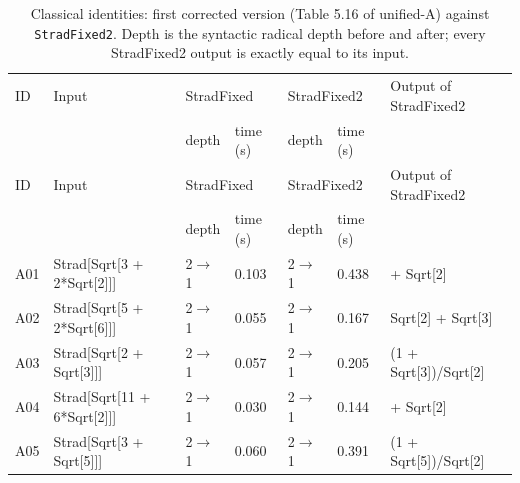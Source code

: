 \begin{longtable}{@{}p{}>{\ttfamily\footnotesize\raggedright\arraybackslash}p{}p{}p{}p{}p{}>{\ttfamily\footnotesize\raggedright\arraybackslash}p{}@{}}
\caption{Classical identities: first corrected version (Table 5.16 of unified-A) against \texttt{StradFixed2}. Depth is the syntactic radical depth before and after; every StradFixed2 output is exactly equal to its input.}\label{tab:cmpA}\\
\toprule ID & Input & \multicolumn{2}{l}{StradFixed} & \multicolumn{2}{l}{StradFixed2} & Output of StradFixed2\\ & & depth & time (s) & depth & time (s) & \\\midrule\endfirsthead
\toprule ID & Input & \multicolumn{2}{l}{StradFixed} & \multicolumn{2}{l}{StradFixed2} & Output of StradFixed2\\ & & depth & time (s) & depth & time (s) & \\\midrule\endhead
\bottomrule\endfoot
A01 & Strad[\allowbreak{}Sqrt[\allowbreak{}3 +\allowbreak{} 2*\allowbreak{}Sqrt[\allowbreak{}2]\allowbreak{}]\allowbreak{}]\allowbreak{} & 2$\to$1 & 0.103 & 2$\to$1 & 0.438 & 1 +\allowbreak{} Sqrt[\allowbreak{}2]\allowbreak{}\\
A02 & Strad[\allowbreak{}Sqrt[\allowbreak{}5 +\allowbreak{} 2*\allowbreak{}Sqrt[\allowbreak{}6]\allowbreak{}]\allowbreak{}]\allowbreak{} & 2$\to$1 & 0.055 & 2$\to$1 & 0.167 & Sqrt[\allowbreak{}2]\allowbreak{} +\allowbreak{} Sqrt[\allowbreak{}3]\allowbreak{}\\
A03 & Strad[\allowbreak{}Sqrt[\allowbreak{}2 +\allowbreak{} Sqrt[\allowbreak{}3]\allowbreak{}]\allowbreak{}]\allowbreak{} & 2$\to$1 & 0.057 & 2$\to$1 & 0.205 & (\allowbreak{}1 +\allowbreak{} Sqrt[\allowbreak{}3]\allowbreak{})\allowbreak{}/\allowbreak{}Sqrt[\allowbreak{}2]\allowbreak{}\\
A04 & Strad[\allowbreak{}Sqrt[\allowbreak{}11 +\allowbreak{} 6*\allowbreak{}Sqrt[\allowbreak{}2]\allowbreak{}]\allowbreak{}]\allowbreak{} & 2$\to$1 & 0.030 & 2$\to$1 & 0.144 & 3 +\allowbreak{} Sqrt[\allowbreak{}2]\allowbreak{}\\
A05 & Strad[\allowbreak{}Sqrt[\allowbreak{}3 +\allowbreak{} Sqrt[\allowbreak{}5]\allowbreak{}]\allowbreak{}]\allowbreak{} & 2$\to$1 & 0.060 & 2$\to$1 & 0.391 & (\allowbreak{}1 +\allowbreak{} Sqrt[\allowbreak{}5]\allowbreak{})\allowbreak{}/\allowbreak{}Sqrt[\allowbreak{}2]\allowbreak{}\\

\end{longtable}
